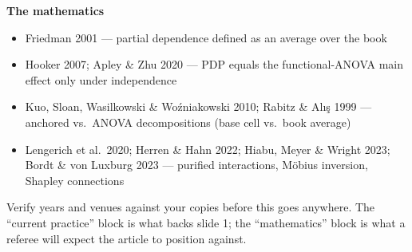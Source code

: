 \documentclass[
  letterpaper,
  DIV=11,
  numbers=noendperiod]{scrartcl}
\providecommand{\tightlist}{%
  \setlength{\itemsep}{0pt}\setlength{\parskip}{0pt}}
\begin{document}
\textbf{The mathematics}

\begin{itemize}
\tightlist
\item
  Friedman 2001 --- partial dependence defined as an average over the
  book
\item
  Hooker 2007; Apley \& Zhu 2020 --- PDP equals the functional-ANOVA
  main effect only under independence
\item
  Kuo, Sloan, Wasilkowski \& Woźniakowski 2010; Rabitz \& Alış 1999 ---
  anchored vs.~ANOVA decompositions (base cell vs.~book average)
\item
  Lengerich et al.~2020; Herren \& Hahn 2022; Hiabu, Meyer \& Wright
  2023; Bordt \& von Luxburg 2023 --- purified interactions, Möbius
  inversion, Shapley connections
\end{itemize}

Verify years and venues against your copies before this goes anywhere.
The ``current practice'' block is what backs slide 1; the
``mathematics'' block is what a referee will expect the article to
position against.
\end{document}
